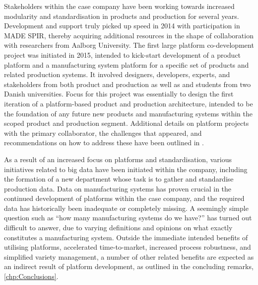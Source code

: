 Stakeholders within the case company have been working towards increased modularity and standardisation in products and production for several years. 
Development and support truly picked up speed in 2014 with participation in MADE SPIR, thereby acquiring additional resources in the shape of collaboration with researchers from Aalborg University.
The first large platform co-development project was initiated in 2015, intended to kick-start development of a product platform and a manufacturing system platform for a specific set of products and related production systems.
It involved designers, developers, experts, and stakeholders from both product and production as well as \PhD{} and \MSc{} students from two Danish universities.
Focus for this project was essentially to design the first iteration of a platform-based product and production architecture, intended to be the foundation of any future new products and manufacturing systems within the scoped product and production segment.
Additional details on platform projects with the primary collaborator, the challenges that appeared, and recommendations on how to address these have been outlined in \parencite{SorensenAPMS2018}.

As a result of an increased focus on platforms and standardisation, various initiatives related to big data have been initiated within the company, including the formation of a new department whose task is to gather and standardise production data.
Data on manufacturing systems has proven crucial in the continued development of platforms within the case company, and the required data has historically been inadequate or completely missing.
A seemingly simple question such as ``how many manufacturing systems do we have?'' has turned out difficult to answer, due to varying definitions and opinions on what exactly constitutes a manufacturing system.
Outside the immediate intended benefits of utilising platforms, \eg{} accelerated time-to-market, increased process robustness, and simplified variety management, a number of other related benefits are expected as an indirect result of platform development, as outlined in the concluding remarks, \cref{chp:Conclusions}.

